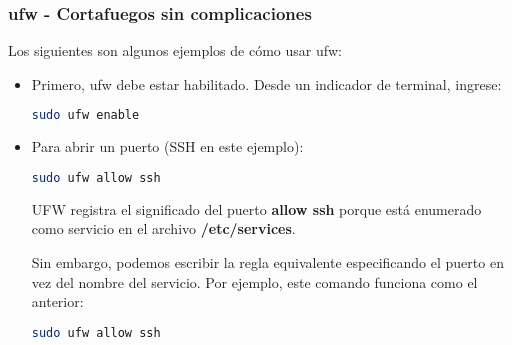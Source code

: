 \begin{frame}[fragile]
  \frametitle{ufw - Cortafuegos sin complicaciones}
  Los siguientes son algunos ejemplos de cómo usar ufw:
  \begin{itemize}
    \item Primero, ufw debe estar habilitado. Desde un indicador de terminal,
      ingrese:
      \begin{lstlisting}[language=Bash]
sudo ufw enable
      \end{lstlisting}
    \item Para abrir un puerto (SSH en este ejemplo):
      \begin{lstlisting}[language=Bash]
sudo ufw allow ssh
      \end{lstlisting}
      UFW registra el significado del puerto \textbf{allow ssh} porque está 
      enumerado como servicio en el archivo \textbf{/etc/services}.

      Sin embargo, podemos escribir la regla equivalente especificando el
      puerto en vez del nombre del servicio. Por ejemplo, este comando
      funciona como el anterior:
      \begin{lstlisting}[language=Bash]
sudo ufw allow ssh
      \end{lstlisting}
  \end{itemize}
\end{frame}
